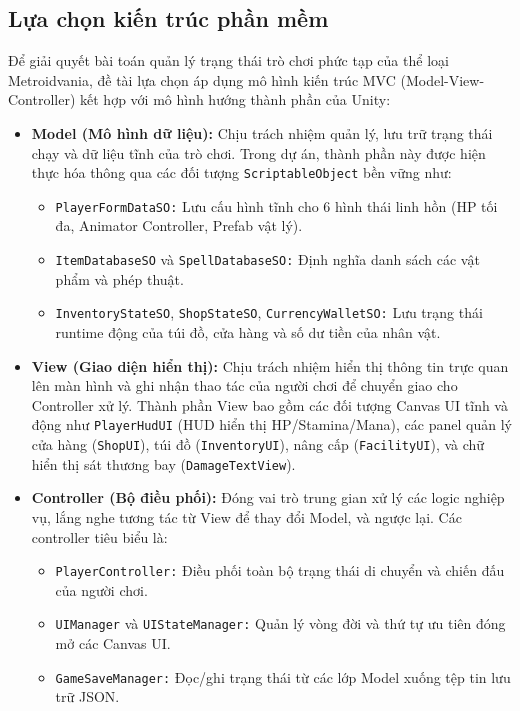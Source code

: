 \documentclass[../DoAn.tex]{subfiles}
\begin{document}
\subsection{Lựa chọn kiến trúc phần mềm}
\label{subsection:4.1.1}
Để giải quyết bài toán quản lý trạng thái trò chơi phức tạp của thể loại Metroidvania, đề tài lựa chọn áp dụng mô hình kiến trúc MVC (Model-View-Controller) kết hợp với mô hình hướng thành phần của Unity:
\begin{itemize}
    \item \textbf{Model (Mô hình dữ liệu):} Chịu trách nhiệm quản lý, lưu trữ trạng thái chạy và dữ liệu tĩnh của trò chơi. Trong dự án, thành phần này được hiện thực hóa thông qua các đối tượng \texttt{ScriptableObject} bền vững như:
    \begin{itemize}
        \item \texttt{PlayerFormDataSO:} Lưu cấu hình tĩnh cho 6 hình thái linh hồn (HP tối đa, Animator Controller, Prefab vật lý).
        \item \texttt{ItemDatabaseSO} và \texttt{SpellDatabaseSO:} Định nghĩa danh sách các vật phẩm và phép thuật.
        \item \texttt{InventoryStateSO}, \texttt{ShopStateSO}, \texttt{CurrencyWalletSO:} Lưu trạng thái runtime động của túi đồ, cửa hàng và số dư tiền của nhân vật.
    \end{itemize}
    \item \textbf{View (Giao diện hiển thị):} Chịu trách nhiệm hiển thị thông tin trực quan lên màn hình và ghi nhận thao tác của người chơi để chuyển giao cho Controller xử lý. Thành phần View bao gồm các đối tượng Canvas UI tĩnh và động như \texttt{PlayerHudUI} (HUD hiển thị HP/Stamina/Mana), các panel quản lý cửa hàng (\texttt{ShopUI}), túi đồ (\texttt{InventoryUI}), nâng cấp (\texttt{FacilityUI}), và chữ hiển thị sát thương bay (\texttt{DamageTextView}).
    \item \textbf{Controller (Bộ điều phối):} Đóng vai trò trung gian xử lý các logic nghiệp vụ, lắng nghe tương tác từ View để thay đổi Model, và ngược lại. Các controller tiêu biểu là:
    \begin{itemize}
        \item \texttt{PlayerController:} Điều phối toàn bộ trạng thái di chuyển và chiến đấu của người chơi.
        \item \texttt{UIManager} và \texttt{UIStateManager:} Quản lý vòng đời và thứ tự ưu tiên đóng mở các Canvas UI.
        \item \texttt{GameSaveManager:} Đọc/ghi trạng thái từ các lớp Model xuống tệp tin lưu trữ JSON.
    \end{itemize}
\end{itemize}
\end{document}
